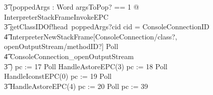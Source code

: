 \begin{figure}[tp!]
{\begin{circus}
    \t3 (\circvar poppedArgs : Word \circspot \lschexpract \exists argsToPop? == 1 @ InterpreterStackFrameInvokeEPC \rschexpract \circseq \\
    \t3 getClassIDOf!head~poppedArgs?cid \then \circif cid = ConsoleConnectionID \circthen {} \\
    \t4 \lschexpract InterpreterNewStackFrame[ConsoleConnection/class?, openOutputStream/methodID?] \rschexpract \circseq Poll \circseq \\
    \t4 ConsoleConnection\_openOutputStream \\
    \t3 \circfi) \circseq pc := 17 \circseq Poll \circseq HandleAstoreEPC(3) \circseq pc := 18 \circseq Poll \circseq HandleIconstEPC(0) \circseq pc := 19 \circseq Poll \circseq \\
    \t3 HandleAstoreEPC(4) \circseq pc := 20 \circseq Poll \circseq pc := 39 \\

\end{circus}}
\end{figure}
